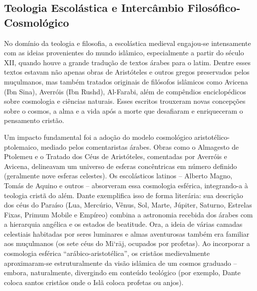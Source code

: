 \subsection{Teologia Escolástica e Intercâmbio Filosófico-Cosmológico}

No domínio da teologia e filosofia, a escolástica medieval engajou-se intensamente com as ideias provenientes do mundo islâmico, especialmente a partir do século XII, quando houve a grande tradução de textos árabes para o latim. Dentre esses textos estavam não apenas obras de Aristóteles e outros gregos preservados pelos muçulmanos, mas também tratados originais de filósofos islâmicos como Avicena (Ibn Sina), Averróis (Ibn Rushd), Al-Farabi, além de compêndios enciclopédicos sobre cosmologia e ciências naturais. Esses escritos trouxeram novas concepções sobre o cosmos, a alma e a vida após a morte que desafiaram e enriqueceram o pensamento cristão.

Um impacto fundamental foi a adoção do modelo cosmológico aristotélico-ptolemaico, mediado pelos comentaristas árabes. Obras como o Almagesto de Ptolemeu e o Tratado dos Céus de Aristóteles, comentadas por Averróis e Avicena, delineavam um universo de esferas concêntricas em número definido (geralmente nove esferas celestes). Os escolásticos latinos -- Alberto Magno, Tomás de Aquino e outros -- absorveram essa cosmologia esférica, integrando-a à teologia cristã do além. Dante exemplifica isso de forma literária: sua descrição dos céus do Paraíso (Lua, Mercúrio, Vênus, Sol, Marte, Júpiter, Saturno, Estrelas Fixas, Primum Mobile e Empíreo) combina a astronomia recebida dos árabes com a hierarquia angélica e os estados de beatitude. Ora, a ideia de várias camadas celestiais habitadas por seres luminares e almas aventurosas também era familiar aos muçulmanos (os sete céus do Mi‘rāj, ocupados por profetas). Ao incorporar a cosmologia esférica “arábico-aristotélica”, os cristãos medievalmente aproximaram-se estruturalmente da visão islâmica de um cosmos graduado -- embora, naturalmente, divergindo em conteúdo teológico (por exemplo, Dante coloca santos cristãos onde o Islã coloca profetas ou anjos).

